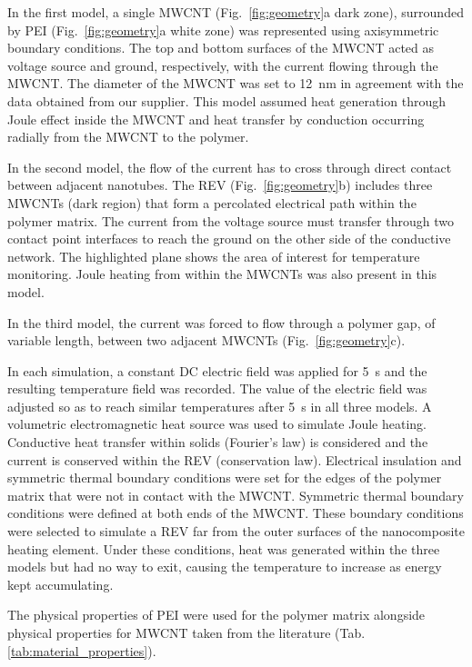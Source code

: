 \FloatBarrier

In the first model, a single MWCNT (Fig.~\ref{fig:geometry}a dark zone), surrounded by PEI (Fig.~\ref{fig:geometry}a white zone) was represented using axisymmetric boundary conditions. 
The top and bottom surfaces of the MWCNT acted as voltage source and ground, respectively, with the current flowing through the MWCNT. 
The diameter of the MWCNT was set to \SI{12}{\nano\metre} in agreement with the data obtained from our supplier. 
This model assumed heat generation through Joule effect inside the MWCNT and heat transfer by conduction occurring radially from the MWCNT to the polymer.

In the second model, the flow of the current has to cross through direct contact between adjacent nanotubes. 
The REV (Fig.~\ref{fig:geometry}b) includes three MWCNTs (dark region) that form a percolated electrical path within the polymer matrix. 
The current from the voltage source must transfer through two contact point interfaces to reach the ground on the other side of the conductive network. 
The highlighted plane shows the area of interest for temperature monitoring. 
Joule heating from within the MWCNTs was also present in this model. 

In the third model, the current was forced to flow through a polymer gap, of variable length, between two adjacent MWCNTs (Fig.~\ref{fig:geometry}c). 

In each simulation, a constant DC electric field was applied for \SI{5}{\second} and the resulting temperature field was recorded. 
The value of the electric field was adjusted so as to reach similar temperatures after \SI{5}{\second} in all three models. 
A volumetric electromagnetic heat source was used to simulate Joule heating. 
Conductive heat transfer within solids (Fourier's law) is considered and the current is conserved within the REV (conservation law). 
Electrical insulation and symmetric thermal boundary conditions were set for the edges of the polymer matrix that were not in contact with the MWCNT. 
Symmetric thermal boundary conditions were defined at both ends of the MWCNT. 
These boundary conditions were selected to simulate a REV far from the outer surfaces of the nanocomposite heating element. 
Under these conditions, heat was generated within the three models but had no way to exit, causing the temperature to increase as energy kept accumulating.

The physical properties of PEI were used for the polymer matrix alongside physical properties for MWCNT taken from the literature (Tab. \ref{tab:material_properties}). 

